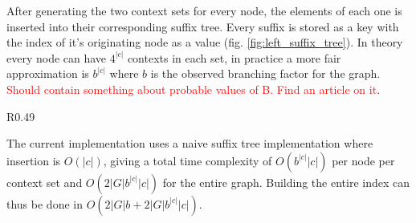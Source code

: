 \documentclass[thesis.tex]{subfiles}
\begin{document}
\par\noindent
After generating the two context sets for every node, the elements of each one is inserted into their corresponding suffix tree. Every suffix is stored as a key with the index of it's originating node as a value (fig. \ref{fig:left_suffix_tree}). In theory every node can have $4^{|c|}$ contexts in each set, in practice a more fair approximation is $b^{|c|}$ where $b$ is the observed branching factor for the graph. \textcolor{red}{Should contain something about probable values of B. Find an article on it}. 
\begin{wrapfigure}{R}{0.49\textwidth}
  \begin{mdframed}
  \end{mdframed}
  \caption{The left suffix tree corresponding to the graph in \ref{fig:explicit_contexts}}
  \label{fig:left_suffix_tree}
\end{wrapfigure}
The current implementation uses a naive suffix tree implementation where insertion is $O(|c|)$, giving a total time complexity of $O(b^{|c|}|c|)$ per node per context set and $O(2|G|b^{|c|}|c|)$ for the entire graph. Building the entire index can thus be done in $O(2|G|b + 2|G|b^{|c|}|c|)$.
\end{document}
